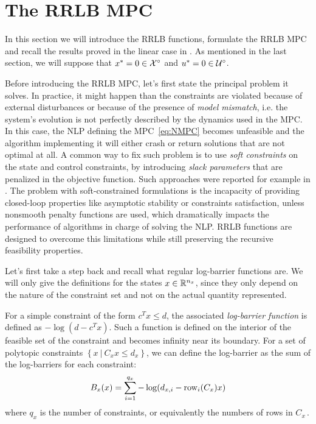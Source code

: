 \documentclass[12pt]{article}
\begin{document}
\section{The RRLB MPC}\label{sec:RRLB-MPC}

In this section we will introduce the RRLB functions, formulate the RRLB MPC and recall the results proved in the linear case in \cite{RRLB-linear-MPC}.
As mentioned in the last section, we will suppose that $x^*=0\in\cal{X}^\circ$ and $u^*=0\in\cal{U}^\circ$.

Before introducing the RRLB MPC, let's first state the principal problem it solves.
In practice, it might happen than the constraints are violated because of external disturbances or because of the presence of \textit{model mismatch}, i.e. the system's evolution is not perfectly described by the dynamics used in the MPC.
In this case, the NLP defining the MPC~\ref{eq:NMPC} becomes unfeasible and the algorithm implementing it will either crash or return solutions that are not optimal at all.
A common way to fix such problem is to use \textit{soft constraints} on the state and control constraints, by introducing \textit{slack parameters} that are penalized in the objective function.
Such approaches were reported for example in \cite{soft-constrained-MPC}.
The problem with soft-constrained formulations is the incapacity of providing closed-loop properties like asymptotic stability or constraints satisfaction, unless nonsmooth penalty functions are used, which dramatically impacts the performance of algorithms in charge of solving the NLP.
RRLB functions are designed to overcome this limitations while still preserving the recursive feasibility properties.

\vspace{12pt}

Let's first take a step back and recall what regular log-barrier functions are.
We will only give the definitions for the states $x\in\R^{n_x}$, since they only depend on the nature of the constraint set and not on the actual quantity represented.

For a simple constraint of the form $c^Tx\leq d$, the associated \textit{log-barrier function} is defined as $-\log(d-c^Tx)$.
Such a function is defined on the interior of the feasible set of the constraint and becomes infinity near its boundary.
For a set of polytopic constraints $\left\{ x~|~C_xx\leq d_x \right\}$, we can define the log-barrier as the sum of the log-barriers for each constraint:
$$B_x(x)=\sum_{i=1}^{q_x}-\log(d_{x,i}-\rm{row}_i(C_x)x)$$
where $q_x$ is the number of constraints, or equivalently the numbers of rows in $C_x$\,.
\end{document}
